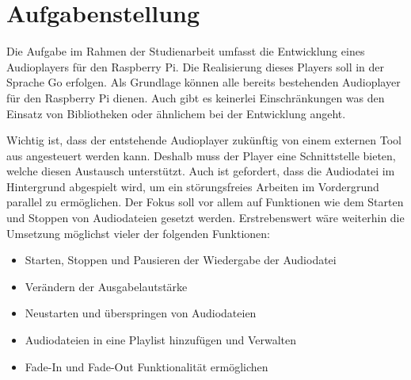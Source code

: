 
\chapter{Aufgabenstellung}
Die Aufgabe im Rahmen der Studienarbeit umfasst die Entwicklung eines
Audioplayers für den Raspberry Pi. Die Realisierung dieses Players soll in der
Sprache Go erfolgen. Als Grundlage können alle bereits bestehenden Audioplayer
für den Raspberry Pi dienen. Auch gibt es keinerlei Einschränkungen was den
Einsatz von Bibliotheken oder ähnlichem bei der Entwicklung angeht. \hfill
\break

Wichtig ist, dass der entstehende Audioplayer zukünftig von einem externen Tool aus
angesteuert werden kann. Deshalb muss der Player eine Schnittstelle bieten,
welche diesen Austausch unterstützt. Auch ist gefordert, dass die Audiodatei im
Hintergrund abgespielt wird, um ein störungsfreies Arbeiten im Vordergrund
parallel zu ermöglichen. \hfill \break
Der Fokus soll vor allem auf Funktionen wie dem Starten und Stoppen von
Audiodateien gesetzt werden. Erstrebenswert wäre weiterhin die Umsetzung
möglichst vieler der folgenden Funktionen: 

\begin{itemize}
\item Starten, Stoppen und Pausieren der Wiedergabe der Audiodatei
\item Verändern der Ausgabelautstärke
\item Neustarten und überspringen von Audiodateien
\item Audiodateien in eine Playlist hinzufügen und Verwalten
\item Fade-In und Fade-Out Funktionalität ermöglichen
\end{itemize}

